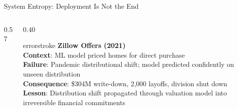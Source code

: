 \documentclass[aspectratio=169, 12pt]{beamer}
\begin{document}
\begin{frame}{System Entropy: Deployment Is Not the End}
\begin{columns}[T]
\begin{column}{0.57\textwidth}
    \vspace{0.1cm}
  \end{column}
  \begin{column}{0.40\textwidth}
    \begin{mlsyscard}{errorstroke}
    \textbf{Zillow Offers (2021)}\\[0.03cm]
    {\scriptsize
    \textbf{Context}: ML model priced homes for direct purchase\\[0.03cm]
    \textbf{Failure}: Pandemic distributional shift; model predicted confidently on unseen distribution\\[0.03cm]
    \textbf{Consequence}: \$304M write-down, 2,000 layoffs, division shut down\\[0.03cm]
    \textbf{Lesson}: Distribution shift propagated through valuation model into irreversible financial commitments
    }
    \end{mlsyscard}
  \end{column}
\end{columns}

\end{frame}
\end{document}
